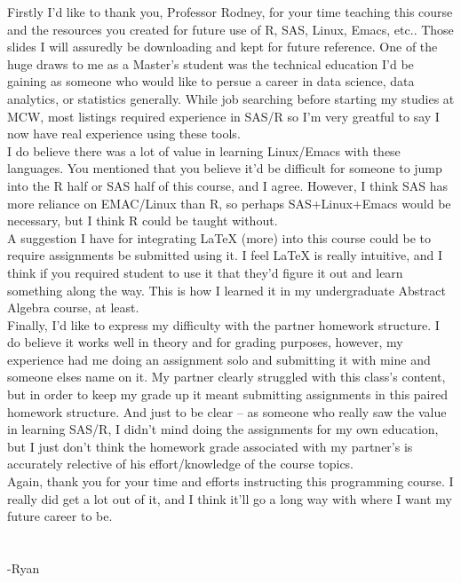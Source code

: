 \documentclass[12pt,answers]{exam}
\begin{document}
Firstly I'd like to thank you, Professor Rodney, for your time teaching this course and the resources you created for future use of R, SAS, Linux, Emacs, etc.. Those slides I will assuredly be downloading and kept for future reference. One of the huge draws to me as a Master's student was the technical education I'd be gaining as someone who would like to persue a career in data science, data analytics, or statistics generally. While job searching before starting my studies at MCW, most listings required experience in SAS/R so I'm very greatful to say I now have real experience using these tools.
\\


I do believe there was a lot of value in learning Linux/Emacs with these languages. You mentioned that you believe it'd be difficult for someone to jump into the R half or SAS half of this course, and I agree. However, I think SAS has more reliance on EMAC/Linux than R, so perhaps SAS+Linux+Emacs would be necessary, but I think R could be taught without. 
\\


A suggestion I have for integrating LaTeX (more) into this course could be to require assignments be submitted using it. I feel LaTeX is really intuitive, and I think if you required student to use it that they'd figure it out and learn something along the way. This is how I learned it in my undergraduate Abstract Algebra course, at least.
\\

Finally, I'd like to express my difficulty with the partner homework structure. I do believe it works well in theory and for grading purposes, however, my experience had me doing an assignment solo and submitting it with mine and someone elses name on it. My partner clearly struggled with this class's content, but in order to keep my grade up it meant submitting assignments in this paired homework structure. And just to be clear -- as someone who really saw the value in learning SAS/R, I didn't mind doing the assignments for my own education, but I just don't think the homework grade associated with my partner's is accurately relective of his effort/knowledge of the course topics.
\\

Again, thank you for your time and efforts instructing this programming course. I really did get a lot out of it, and I think it'll go a long way with where I want my future career to be. 
\\
\\
\\
-Ryan
\end{document}

